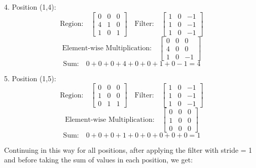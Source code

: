 \documentclass{article}
\begin{document}
4. Position (1,4):
\[
  \text{Region:} \quad \begin{bmatrix} 0 & 0 & 0 \\ 4 & 1 & 0 \\ 1 & 0 & 1 \end{bmatrix} \quad \text{Filter:} \quad \begin{bmatrix} 1 & 0 & -1 \\ 1 & 0 & -1 \\ 1 & 0 & -1 \end{bmatrix}
\]
\[
  \text{Element-wise Multiplication:} \quad \begin{bmatrix} 0 & 0 & 0 \\ 4 & 0 & 0 \\ 1 & 0 & -1 \end{bmatrix}
\]
\[
  \text{Sum:} \quad 0 + 0 + 0 + 4 + 0 + 0 + 1 + 0 - 1 = 4
\]

5. Position (1,5):
\[
  \text{Region:} \quad \begin{bmatrix} 0 & 0 & 0 \\ 1 & 0 & 0 \\ 0 & 1 & 1 \end{bmatrix} \quad \text{Filter:} \quad \begin{bmatrix} 1 & 0 & -1 \\ 1 & 0 & -1 \\ 1 & 0 & -1 \end{bmatrix}
\]
\[
  \text{Element-wise Multiplication:} \quad \begin{bmatrix} 0 & 0 & 0 \\ 1 & 0 & 0 \\ 0 & 0 & 0 \end{bmatrix}
\]
\[
  \text{Sum:} \quad 0 + 0 + 0 + 1 + 0 + 0 + 0 + 0 + 0 = 1
\]

Continuing in this way for all positions, after applying the filter with stride = 1 and before taking the sum of values in each position, we get:
\end{document}

